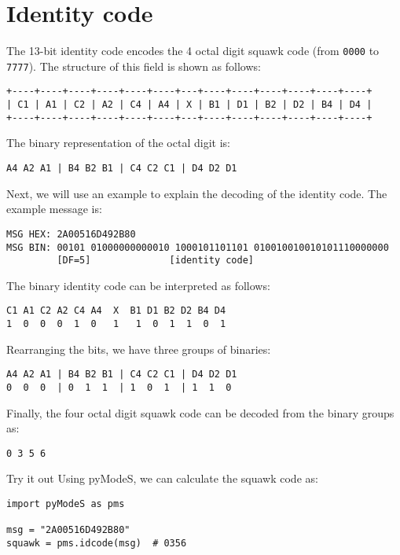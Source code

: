 \section{Identity code} \label{sec:id_code}

The 13-bit identity code encodes the 4 octal digit squawk code (from \texttt{0000} to \texttt{7777}). The structure of this field is shown as follows:

\begin{verbatim}
+----+----+----+----+----+----+---+----+----+----+----+----+----+
| C1 | A1 | C2 | A2 | C4 | A4 | X | B1 | D1 | B2 | D2 | B4 | D4 |
+----+----+----+----+----+----+---+----+----+----+----+----+----+
\end{verbatim}

The binary representation of the octal digit is:

\begin{verbatim}
A4 A2 A1 | B4 B2 B1 | C4 C2 C1 | D4 D2 D1
\end{verbatim}


Next, we will use an example to explain the decoding of the identity code. The example message is:

\begin{verbatim}
MSG HEX: 2A00516D492B80
MSG BIN: 00101 01000000000010 1000101101101 010010010010101110000000
         [DF=5]              [identity code]
\end{verbatim}

The binary identity code can be interpreted as follows:

\begin{verbatim}
C1 A1 C2 A2 C4 A4  X  B1 D1 B2 D2 B4 D4
1  0  0  0  1  0   1   1  0  1  1  0  1
\end{verbatim}

Rearranging the bits, we have three groups of binaries:
\begin{verbatim}
A4 A2 A1 | B4 B2 B1 | C4 C2 C1 | D4 D2 D1
0  0  0  | 0  1  1  | 1  0  1  | 1  1  0
\end{verbatim}

Finally, the four octal digit squawk code can be decoded from the binary groups as:
\begin{verbatim}
0 3 5 6
\end{verbatim}

\begin{notebox}{Try it out}
Using pyModeS, we can calculate the squawk code as: 

\begin{verbatim}
import pyModeS as pms

msg = "2A00516D492B80"
squawk = pms.idcode(msg)  # 0356
\end{verbatim}

\end{notebox}